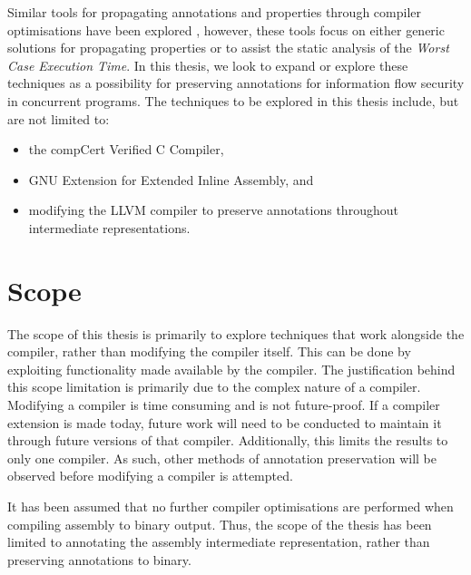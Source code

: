 \documentclass[12pt, a4paper]{report}
\begin{document}
Similar tools for propagating annotations and properties through compiler optimisations have been explored \cite{vu2020secure} \cite{schommer2018embedded} \cite{leroy2016compcert}, however, these tools focus on either generic solutions for propagating properties or to assist the static analysis of the \textit{Worst Case Execution Time}. In this thesis, we look to expand or explore these techniques as a possibility for preserving annotations for information flow security in concurrent programs. The techniques to be explored in this thesis include, but are not limited to: 

\begin{itemize}
    \item the compCert Verified C Compiler, 
    \item GNU Extension for Extended Inline Assembly, and
    \item modifying the LLVM compiler to preserve annotations throughout intermediate representations.
\end{itemize}

\section{Scope}
The scope of this thesis is primarily to explore techniques that work alongside the compiler, rather than modifying the compiler itself. This can be done by exploiting functionality made available by the compiler. The justification behind this scope limitation is primarily due to the complex nature of a compiler. Modifying a compiler is time consuming and is not future-proof. If a compiler extension is made today, future work will need to be conducted to maintain it through future versions of that compiler. Additionally, this limits the results to only one compiler. As such, other methods of annotation preservation will be observed before modifying a compiler is attempted.

It has been assumed that no further compiler optimisations are performed when compiling assembly to binary output. Thus, the scope of the thesis has been limited to annotating the assembly intermediate representation, rather than preserving annotations to binary. 




\clearpage




\clearpage
\printbibliography
\clearpage


\end{document}
